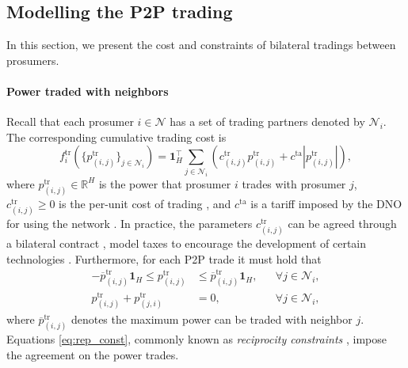 \documentclass{IEEEtran}  %
\newcommand{\mc}{\mathcal}
\newcommand{\bb}{\mathbb}
\newcommand{\R}{\bb R}
\newcommand{\0}{\mathbf{0}}
\newcommand{\1}{\mathbf{1}}
\newcommand{\edit}[1]{\color{blue}{#1}\color{black}}
\begin{document}
\subsection{Modelling the P2P trading}
\label{sec:mod_tr}
 
In this section, we present the cost and constraints of bilateral tradings between prosumers.

\smallskip
\paragraph*{Power traded with neighbors}
Recall that each prosumer $i \in \mc N$ has a set of trading partners denoted by $\mc N_i$. The corresponding cumulative trading cost is 
\begin{equation}
f_{i}^{\mathrm{tr}} \left( \{ p_{(i,j)}^{\mathrm{tr}} \}_{j \in \mc N_i} \right) = 
\1_H^\top \sum_{j\in \mathcal{N}_i} \left(
c_{(i,j)}^{\mathrm{tr}}p_{(i,j)}^{\mathrm{tr}}\!+\! c^{\mathrm{ta}}  |p_{(i,j)}^{\mathrm{tr}}|\right)
,
 \label{eq:f_t}
\end{equation}
where $p_{(i,j)}^{\mathrm{tr}} \in \R^{H}$ is the power that prosumer $i$ trades with prosumer $j$, $c_{(i,j)}^{\mathrm{tr}} \geq 0$ is the per-unit cost of trading \cite{lecadre2020}, and $c^{\mathrm{ta}}$ is a tariff imposed by the DNO for using the network \cite{baroche2019}. In  practice, the parameters $c_{(i,j)}^{\mathrm{tr}}$ can be agreed through a bilateral contract \cite{sousa2019}, model taxes to encourage the development of certain technologies  \edit{or be used for the purpose of product differentiation} \cite{sorin2019,baroche2019,lecadre2020}. Furthermore, for each P2P trade it must hold that
\begin{subequations}
\begin{align}
-\overline{p}_{(i,j)}^{\mathrm{tr}}\1_H \leq p_{(i,j)}^{\mathrm{tr}} &\leq \overline{p}_{(i,j)}^{\mathrm{tr}}\1_H, & & \forall j\in\mathcal{N}_i, \label{eq:p_t_bound}\\
p_{(i,j)}^{\mathrm{tr}}  + p_{(j,i)}^{\mathrm{tr}}&=0, & & \forall j\in\mathcal{N}_i, \label{eq:rep_const}
\end{align}
\label{eq:ptr_cons}%
\end{subequations}
where $ \overline{p}_{(i,j)}^{\mathrm{tr}}$ denotes the maximum power can be traded with neighbor $j$. Equations \eqref{eq:rep_const}, commonly known as \textit{reciprocity constraints} \cite{sousa2019}, impose the agreement on the power trades.

\end{document}
